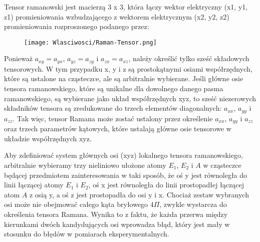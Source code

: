 Tensor ramanowski jest macierzą 3 x 3, która łączy wektor elektryczny (x1, y1, z1) promieniowania wzbudzającego z wektorem elektrycznym (x2, y2, z2) promieniowania rozproszonego podanego przez:

\begin{figure}[H]
	\begin{center}
		\texttt{[image: Wlasciwosci/Raman-Tensor.png]}
	\end{center}
\end{figure}

Ponieważ $a_{xy} = a_{yx}$, $a_{yz} = a_{zy}$ i $a_{zx} = a_{xz}$, należy określić tylko sześć składowych tensorowych. W tym przypadku x, y i z są prostokątnymi osiami współrzędnych, które są ustalone na cząsteczce, ale są arbitralnie wybierane. Jeśli główne osie tensora ramanowskiego, które są unikalne dla dowolnego danego pasma ramanowskiego, są wybierane jako układ współrzędnych xyz, to sześć niezerowych składników tensora są zredukowane do trzech elementów diagonalnych: $a_{xx}$, $a_{yy}$ i $a_{zz}$. Tak więc, tensor Ramana może zostać ustalony przez określenie $a_{xx}$, $a_{yy}$ i $a_{zz}$ oraz trzech parametrów kątowych, które ustalają główne osie tensorowe w układzie współrzędnych xyz.

Aby zdefiniować system głównych osi (xyz) lokalnego tensora ramanowskiego, arbitralnie wybieramy trzy nieliniowo ułożone atomy $E_1$, $E_2$ i $A$ w cząsteczce będącej przedmiotem zainteresowania w taki sposób, że oś y jest równoległa do linii łączącej atomy $E_1$ i $E_2$, oś x jest równoległa do linii prostopadłej łączącej atom $A$ z osią y, a oś z jest prostopadła do osi y i x. Chociaż zestaw wybranych osi może nie obejmować całego kąta bryłowego 4$\Pi$, zwykle wystarcza do określenia tensora Ramana. Wynika to z faktu, że każda przerwa między kierunkami dwóch kandydujących osi wprowadza błąd, który jest mały w stosunku do błędów w pomiarach eksperymentalnych.



